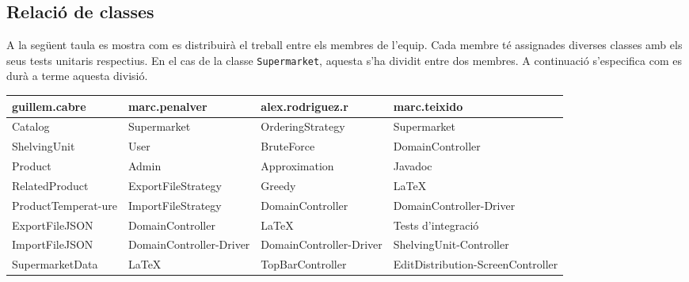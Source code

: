 \documentclass[a4paper,12pt]{report}
\begin{document}
\begin{itemize}
\section{Relació de classes}

A la següent taula es mostra com es distribuirà el treball entre els membres de l’equip. Cada membre té assignades diverses classes amb els seus tests unitaris respectius. En el cas de la classe \texttt{Supermarket}, aquesta s’ha dividit entre dos membres. A continuació s’especifica com es durà a terme aquesta divisió.

\begin{table}[H]
	\centering
	\setlength{\arrayrulewidth}{0.5mm}
	\setlength{\tabcolsep}{5pt}
	\renewcommand{\arraystretch}{1.5}
	\centering
		\begin{tabularx}{\textwidth}{|X|X|X|X|} %
			\hline
			\rowcolor{gray!40} %
			guillem.cabre            & marc.penalver      & alex.rodriguez.r & marc.teixido    \\
			\hline
			Catalog                  & Supermarket        & OrderingStrategy & Supermarket     \\
			\hline
			ShelvingUnit             & User               & BruteForce       & DomainController\\
			\hline
			Product                  & Admin              & Approximation    & Javadoc         \\
			\hline
			RelatedProduct           & ExportFileStrategy & Greedy           & \LaTeX          \\
			\hline
			ProductTemperat-\newline ure       & ImportFileStrategy & DomainController & DomainController-\newline Driver \\
			\hline
			ExportFileJSON           & DomainController   & \LaTeX           & Tests d'integració \\
			\hline
			ImportFileJSON           & DomainController-\newline Driver & DomainController-\newline Driver & ShelvingUnit-\newline Controller \\
			\hline
			SupermarketData          & \LaTeX & TopBarController & EditDistribution-\newline ScreenController                \\
			\hline

\end{tabularx}
\end{table}
\end{itemize}
\end{document}
